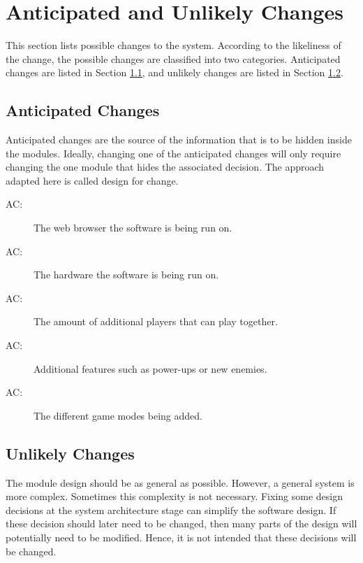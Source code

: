 \documentclass[12pt, titlepage]{article}
\newcounter{acnum}
\newcommand{\actheacnum}{AC\theacnum}
\begin{document}
\section{Anticipated and Unlikely Changes} \label{SecChange}

This section lists possible changes to the system. According to the likeliness
of the change, the possible changes are classified into two
categories. Anticipated changes are listed in Section \ref{SecAchange}, and
unlikely changes are listed in Section \ref{SecUchange}.

\subsection{Anticipated Changes} \label{SecAchange}

Anticipated changes are the source of the information that is to be hidden
inside the modules. Ideally, changing one of the anticipated changes will only
require changing the one module that hides the associated decision. The approach
adapted here is called design for
change.

\begin{description}
\item[ \actheacnum \label{browser}:] The web browser the software is being run on.
\item[ \actheacnum \label{hardware}:] The hardware the software is being run on.
\item[ \actheacnum \label{players}:] The amount of additional players that can play together.
\item[ \actheacnum \label{additional features}:] Additional features such as power-ups or new enemies.
\item[ \actheacnum \label{game modes}:] The different game modes being added.


\end{description}

\subsection{Unlikely Changes} \label{SecUchange}

The module design should be as general as possible. However, a general system is
more complex. Sometimes this complexity is not necessary. Fixing some design
decisions at the system architecture stage can simplify the software design. If
these decision should later need to be changed, then many parts of the design
will potentially need to be modified. Hence, it is not intended that these
decisions will be changed.
\end{document}
